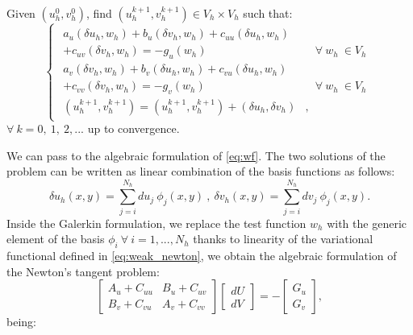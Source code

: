 Given $(u_h^0, v_h^0)$, find $(u_h^{k+1}, v_h^{k+1}) \in V_h \times V_h$ such that:
\begin{equation}\label{eq:wf}
\left\lbrace
\begin{matrix}
\begin{aligned}
  a_u(\delta u_h, w_h) + b_u(\delta v_h, w_h) + c_{uu}(\delta u_h, w_h) &
  \\ + c_{uv}(\delta v_h, w_h) = - g_u(w_h) & \ \ \ \ \forall \ w_h \ \in V_h \\[6pt]
  a_v(\delta v_h, w_h) + b_v(\delta u_h, w_h) + c_{vu}(\delta u_h, w_h) &
  \\ + c_{vv}(\delta v_h, w_h) = - g_v(w_h) & \ \ \ \  \forall \ w_h \ \in V_h \\[6pt]
  (u_h^{k+1},v_h^{k+1}) = (u_h^{k+1},v_h^{k+1}) +  (\delta u_h,\delta v_h) &,
\end{aligned}
\end{matrix}
\right.
\end{equation}
$\forall \ k = 0, \ 1, \ 2,...$ up to convergence.

We can pass to the algebraic formulation of \eqref{eq:wf}. The two solutions of the problem can be written as linear combination of the basis functions as follows:
\begin{equation}
    \delta u_h(x,y) = \sum_{j=i}^{N_h} du_j \ \phi_j(x,y) \ , \ \delta v_h(x,y) = \sum_{j=i}^{N_h} dv_j \ \phi_j(x,y).
\end{equation}
Inside the Galerkin formulation, we replace the test function $w_h$ with the generic element of the basis $\phi_i \ \forall \ i = 1, ..., N_h$ thanks to linearity of the variational functional defined in \eqref{eq:weak_newton}, we obtain the algebraic formulation of the Newton's tangent problem:
\begin{equation}
    \begin{bmatrix} A_u + C_{uu}& B_u + C_{uv} \\B_v + C_{vu} & A_v + C_{vv} \end{bmatrix}
    \begin{bmatrix}dU \\ dV \end{bmatrix} = - \begin{bmatrix} G_u \\ G_v
    \end{bmatrix},
\end{equation}
being:

